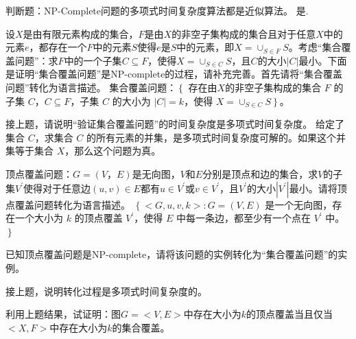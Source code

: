 \begin{problem}
	判断题：NP-Complete问题的多项式时间复杂度算法都是近似算法。
	\solution 是.
\end{problem}

\begin{problem}
	设$X$是由有限元素构成的集合，$F$是由$X$的非空子集构成的集合且对于任意$X$中的元素$e$，都存在一个$F$中的元素$S$使得$e$是$S$中的元素，即$X=\cup_{S\in F}S$。考虑“集合覆盖问题”：求$F$中的一个子集$C\subseteq F$，使得$X=\cup_{S\in C}S$，且$C$的大小$|C|$最小。下面是证明“集合覆盖问题”是NP-complete的过程，请补充完善。首先请将“集合覆盖问题”转化为语言描述。
	\solution 集合覆盖问题：$\left\{\right.$ 存在由$X$的非空子集构成的集合 $F$ 的子集 $C$，$C \subseteq F$，子集 $C$ 的大小为 $|C|=k$，使得 $X=\cup_{S \in C} S$$\left.\right\}$。
\end{problem}

\begin{problem}
	接上题，请说明“验证集合覆盖问题”的时间复杂度是多项式时间复杂度。
	\solution 给定了集合 $C$，求集合 $C$ 的所有元素的并集，是多项式时间复杂度可解的。如果这个并集等于集合 $X$，那么这个问题为真。
\end{problem}

\begin{problem}
	顶点覆盖问题：$G=(V，E)$是无向图，$V$和$E$分别是顶点和边的集合，求$V$的子集$V^\prime$使得对于任意边$(u,v)\in E$都有$u\in V^\prime$或$v\in V^\prime$，且$V^\prime$的大小$|V^\prime|$最小。请将顶点覆盖问题转化为语言描述。
	\solution $\left\{<G, u, v, k>\right. : G = (V, E)$ 是一个无向图，存在一个大小为 $k$ 的顶点覆盖 $V^\prime$，使得 $E$ 中每一条边，都至少有一个点在 $V^\prime$ 中。 $\left.\right\}$
\end{problem}

\begin{problem}[\todo]
	已知顶点覆盖问题是NP-complete，请将该问题的实例转化为“集合覆盖问题”的实例。
	\solution
\end{problem}

\begin{problem}[\todo]
	接上题，说明转化过程是多项式时间复杂度的。
	\solution 
\end{problem}

\begin{problem}[\todo]
	利用上题结果，试证明：图$G=<V,E>$中存在大小为$k$的顶点覆盖当且仅当$<X,F>$中存在大小为$k$的集合覆盖。
	\solution 
\end{problem}

